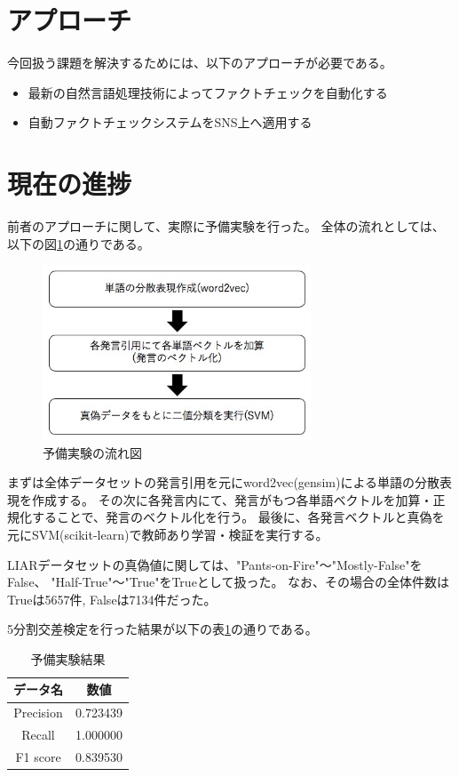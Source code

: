 \documentclass[twocolumn, a4paper, uplatex]{UECIEresume}
\begin{document}
\section{アプローチ}
今回扱う課題を解決するためには、以下のアプローチが必要である。
\begin{itemize}
  \item 最新の自然言語処理技術によってファクトチェックを自動化する
  \item 自動ファクトチェックシステムをSNS上へ適用する
\end{itemize}


\section{現在の進捗}
前者のアプローチに関して、実際に予備実験を行った。
全体の流れとしては、以下の図\ref{fig:nagare}の通りである。

\begin{figure}[h]
  \begin{center}
    \includegraphics[width=8cm]{fig1.jpg}
    \caption{予備実験の流れ図}
    \label{fig:nagare}
  \end{center}
\end{figure}

まずは全体データセットの発言引用を元にword2vec(gensim)による単語の分散表現を作成する。
その次に各発言内にて、発言がもつ各単語ベクトルを加算・正規化することで、発言のベクトル化を行う。
最後に、各発言ベクトルと真偽を元にSVM(scikit-learn)で教師あり学習・検証を実行する。


LIARデータセットの真偽値に関しては、"Pants-on-Fire"〜"Mostly-False"をFalse、
"Half-True"〜"True"をTrueとして扱った。
なお、その場合の全体件数はTrueは5657件, Falseは7134件だった。

5分割交差検定を行った結果が以下の表\ref{tb:result}の通りである。

\begin{table}[h]
  \begin{center}
    \caption{予備実験結果}
    \label{tb:result}
    \begin{tabular}{c c}
      \hline
      データ名 & 数値 \\
      \hline \hline
      Precision & 0.723439 \\
      Recall & 1.000000 \\
      F1 score & 0.839530 \\
      \hline
    \end{tabular}
  \end{center}
\end{table}
\end{document}
